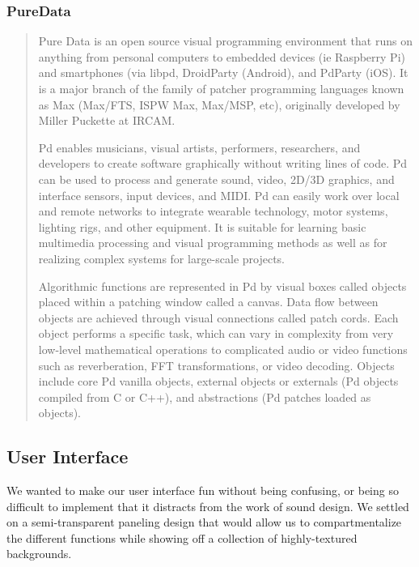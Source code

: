 \documentclass[12pt,a4paper]{article}
\begin{document}
\subsubsection{PureData}

\begin{quote}
Pure Data is an open source visual programming environment that runs on anything from personal computers to embedded devices (ie Raspberry Pi) and smartphones (via libpd, DroidParty (Android), and PdParty (iOS). It is a major branch of the family of patcher programming languages known as Max (Max/FTS, ISPW Max, Max/MSP, etc), originally developed by Miller Puckette at IRCAM.

Pd enables musicians, visual artists, performers, researchers, and developers to create software graphically without writing lines of code. Pd can be used to process and generate sound, video, 2D/3D graphics, and interface sensors, input devices, and MIDI. Pd can easily work over local and remote networks to integrate wearable technology, motor systems, lighting rigs, and other equipment. It is suitable for learning basic multimedia processing and visual programming methods as well as for realizing complex systems for large-scale projects.

Algorithmic functions are represented in Pd by visual boxes called objects placed within a patching window called a canvas. Data flow between objects are achieved through visual connections called patch cords. Each object performs a specific task, which can vary in complexity from very low-level mathematical operations to complicated audio or video functions such as reverberation, FFT transformations, or video decoding. Objects include core Pd vanilla objects, external objects or externals (Pd objects compiled from C or C++), and abstractions (Pd patches loaded as objects). \cite{puredata}
\end{quote}

\subsection{User Interface}
We wanted to make our user interface fun without being confusing, or being so difficult to implement that it distracts from the work of sound design. We settled on a semi-transparent paneling design that would allow us to compartmentalize the different functions while showing off a collection of highly-textured backgrounds.
\end{document}
